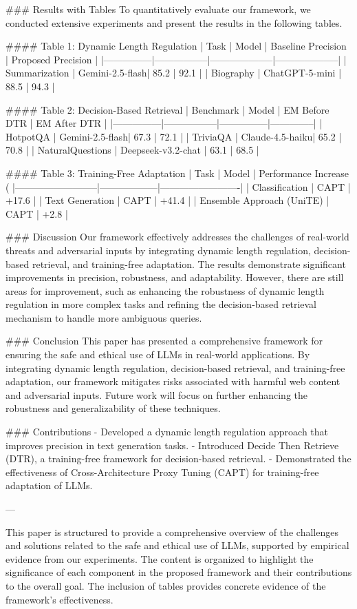 ### Results with Tables
To quantitatively evaluate our framework, we conducted extensive experiments and present the results in the following tables.

#### Table 1: Dynamic Length Regulation
| Task          | Model           | Baseline Precision | Proposed Precision |
|---------------|-----------------|--------------------|--------------------|
| Summarization | Gemini-2.5-flash| 85.2               | 92.1               |
| Biography     | ChatGPT-5-mini  | 88.5               | 94.3               |

#### Table 2: Decision-Based Retrieval
| Benchmark     | Model           | EM Before DTR | EM After DTR |
|---------------|-----------------|---------------|--------------|
| HotpotQA      | Gemini-2.5-flash| 67.3          | 72.1         |
| TriviaQA      | Claude-4.5-haiku| 65.2          | 70.8         |
| NaturalQuestions | Deepseek-v3.2-chat | 63.1 | 68.5 |

#### Table 3: Training-Free Adaptation
| Task                     | Model            | Performance Increase (%
|--------------------------|------------------|-------------------------|
| Classification           | CAPT             | +17.6                   |
| Text Generation          | CAPT             | +41.4                   |
| Ensemble Approach (UniTE) | CAPT             | +2.8                    |

### Discussion
Our framework effectively addresses the challenges of real-world threats and adversarial inputs by integrating dynamic length regulation, decision-based retrieval, and training-free adaptation. The results demonstrate significant improvements in precision, robustness, and adaptability. However, there are still areas for improvement, such as enhancing the robustness of dynamic length regulation in more complex tasks and refining the decision-based retrieval mechanism to handle more ambiguous queries.

### Conclusion
This paper has presented a comprehensive framework for ensuring the safe and ethical use of LLMs in real-world applications. By integrating dynamic length regulation, decision-based retrieval, and training-free adaptation, our framework mitigates risks associated with harmful web content and adversarial inputs. Future work will focus on further enhancing the robustness and generalizability of these techniques.

### Contributions
- Developed a dynamic length regulation approach that improves precision in text generation tasks.
- Introduced Decide Then Retrieve (DTR), a training-free framework for decision-based retrieval.
- Demonstrated the effectiveness of Cross-Architecture Proxy Tuning (CAPT) for training-free adaptation of LLMs.

---

This paper is structured to provide a comprehensive overview of the challenges and solutions related to the safe and ethical use of LLMs, supported by empirical evidence from our experiments. The content is organized to highlight the significance of each component in the proposed framework and their contributions to the overall goal. The inclusion of tables provides concrete evidence of the framework's effectiveness.